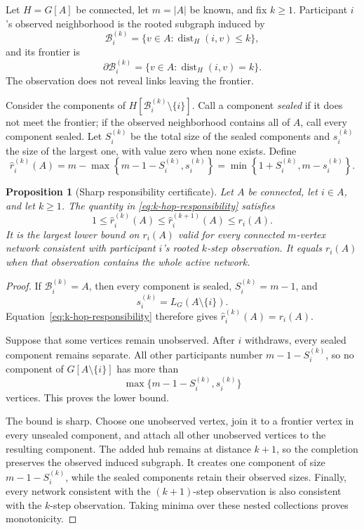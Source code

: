 \documentclass[preprint,12pt,authoryear]{elsarticle}
\newcommand{\LCC}{L}
\newtheorem{proposition}{Proposition}
\begin{document}
Let \(H=G[A]\) be connected, let \(m=|A|\) be known, and fix \(k\geq1\).
Participant \(i\)'s observed neighborhood is the rooted subgraph induced by
\[
 \mathcal B_i^{(k)}
 =\{v\in A:\operatorname{dist}_{H}(i,v)\leq k\},
\]
and its frontier is
\[
 \partial\mathcal B_i^{(k)}
 =\{v\in A:\operatorname{dist}_{H}(i,v)=k\}.
\]
The observation does not reveal links leaving the frontier.

Consider the components of
\(H[\mathcal B_i^{(k)}\setminus\{i\}]\). Call a component \emph{sealed} if it
does not meet the frontier; if the observed neighborhood contains all of
\(A\), call every component sealed. Let \(S_i^{(k)}\) be the total size of
the sealed components and \(s_i^{(k)}\) the size of the largest one, with
value zero when none exists. Define
\begin{equation}
 \hat r_i^{(k)}(A)
 =m-\max\left\{m-1-S_i^{(k)},s_i^{(k)}\right\}
 =\min\left\{1+S_i^{(k)},m-s_i^{(k)}\right\}.
 \label{eq:k-hop-responsibility}
\end{equation}

\begin{proposition}[Sharp responsibility certificate]
\label{prop:k-hop-responsibility}
Let \(A\) be connected, let \(i\in A\), and let \(k\geq1\). The quantity in
\eqref{eq:k-hop-responsibility} satisfies
\[
 1\leq\hat r_i^{(k)}(A)
 \leq\hat r_i^{(k+1)}(A)
 \leq r_i(A).
\]
It is the largest lower bound on \(r_i(A)\) valid for every connected
\(m\)-vertex network consistent with participant \(i\)'s rooted \(k\)-step
observation. It equals \(r_i(A)\) when that observation contains the whole
active network.
\end{proposition}

\begin{proof}
If \(\mathcal B_i^{(k)}=A\), then every component is sealed,
\(S_i^{(k)}=m-1\), and
\[
 s_i^{(k)}=\LCC_G(A\setminus\{i\}).
\]
Equation~\eqref{eq:k-hop-responsibility} therefore gives
\(\hat r_i^{(k)}(A)=r_i(A)\).

Suppose that some vertices remain unobserved. After \(i\) withdraws, every
sealed component remains separate. All other participants number
\(m-1-S_i^{(k)}\), so no component of \(G[A\setminus\{i\}]\) has more than
\[
 \max\{m-1-S_i^{(k)},s_i^{(k)}\}
\]
vertices. This proves the lower bound.

The bound is sharp. Choose one unobserved vertex, join it to a frontier vertex
in every unsealed component, and attach all other unobserved vertices to the
resulting component. The added hub remains at distance \(k+1\), so the
completion preserves the observed induced subgraph. It creates one component
of size \(m-1-S_i^{(k)}\), while the sealed components retain their observed
sizes. Finally, every network consistent with the \((k+1)\)-step observation
is also consistent with the \(k\)-step observation. Taking minima over these
nested collections proves monotonicity.
\end{proof}
\end{document}
